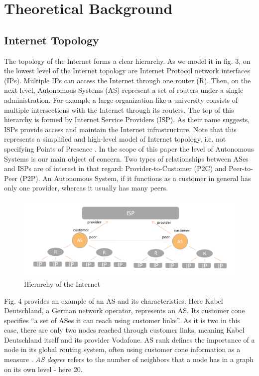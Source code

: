 \documentclass[conference, 11pt]{IEEEtran}
\begin{document}
\section{Theoretical Background} 
\subsection{Internet Topology}

The topology of the Internet forms a clear hierarchy. As we model it in fig. 3, on the lowest level of the Internet topology are Internet Protocol network interfaces (IPs). Multiple IPs can access the Internet through one router (R). Then, on the next level, Autonomous Systems (AS) represent a set of routers under a single administration. For example a large organization like a university consists of multiple intersections with the Internet through its routers. The top of this hierarchy is formed by Internet Service Providers (ISP). As their name suggests, ISPs provide access and maintain the Internet infrastructure. Note that this represents a simplified and high-level model of Internet topology, i.e. not specifying Points of Presence \cite{ASH}. In the scope of this paper the level of Autonomous Systems is our main object of concern. Two types of relationships between ASes and ISPs are of interest in that regard: Provider-to-Customer (P2C) and Peer-to-Peer (P2P). An Autonomous System, if it functions as a customer in general has only one provider, whereas it usually has many peers. 
 

\begin{figure}[htbp]
\centerline{\includegraphics[scale=0.26]{Graphics/hierarchy.PNG}}
\caption{Hierarchy of the Internet}
\label{fig}
\end{figure}
\vspace{0.5cm}





Fig. 4 provides an example of an AS and its characteristics. Here Kabel Deutschland, a German network operator, represents an AS. Its customer cone specifies  ``a set of ASes it can reach using customer links''\cite{Rank}. As it is two in this case, there are only two nodes reached through customer links, meaning Kabel Deutschland itself and its provider Vodafone\cite{Rank}.  
AS rank defines the importance of a node in its global routing system, often using customer cone information as a measure \cite{Rank}.
\textit{AS degree} refers to the number of neighbors that a node has in a graph on its own level - here 20\cite{Cone}.  \\
\end{document}
